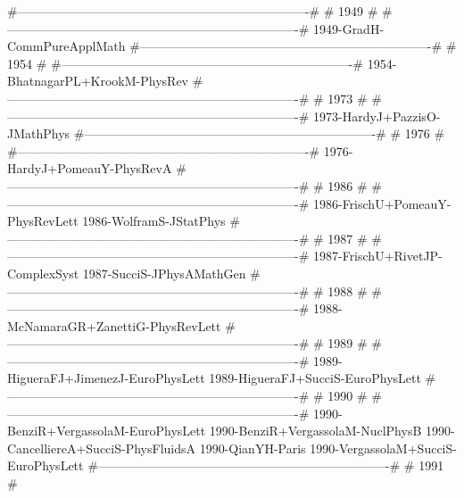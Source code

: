 #----------------------------------------------------------------------#
#                                 1949                                 #
#----------------------------------------------------------------------#
1949-GradH-CommPureApplMath
#----------------------------------------------------------------------#
#                                 1954                                 #
#----------------------------------------------------------------------#
1954-BhatnagarPL+KrookM-PhysRev
#----------------------------------------------------------------------#
#                                 1973                                 #
#----------------------------------------------------------------------#
1973-HardyJ+PazzisO-JMathPhys
#----------------------------------------------------------------------#
#                                 1976                                 #
#----------------------------------------------------------------------#
1976-HardyJ+PomeauY-PhysRevA
#----------------------------------------------------------------------#
#                                 1986                                 #
#----------------------------------------------------------------------#
1986-FrischU+PomeauY-PhysRevLett
1986-WolframS-JStatPhys
#----------------------------------------------------------------------#
#                                 1987                                 #
#----------------------------------------------------------------------#
1987-FrischU+RivetJP-ComplexSyst
1987-SucciS-JPhysAMathGen
#----------------------------------------------------------------------#
#                                 1988                                 #
#----------------------------------------------------------------------#
1988-McNamaraGR+ZanettiG-PhysRevLett
#----------------------------------------------------------------------#
#                                 1989                                 #
#----------------------------------------------------------------------#
1989-HigueraFJ+JimenezJ-EuroPhysLett
1989-HigueraFJ+SucciS-EuroPhysLett
#----------------------------------------------------------------------#
#                                 1990                                 #
#----------------------------------------------------------------------#
1990-BenziR+VergassolaM-EuroPhysLett
1990-BenziR+VergassolaM-NuclPhysB
1990-CancelliereA+SucciS-PhysFluidsA
1990-QianYH-Paris
1990-VergassolaM+SucciS-EuroPhysLett
#----------------------------------------------------------------------#
#                                 1991                                 #
